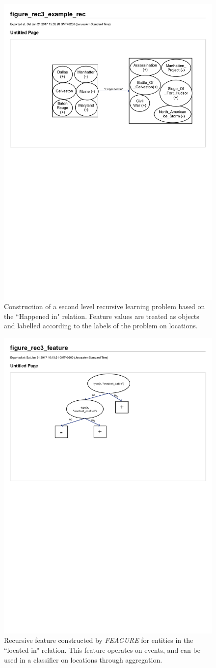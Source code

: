 \documentclass[twoside,11pt]{article}
\theoremstyle{definition}
\begin{document}
 \begin{figure}[!h]
 	\centering
 	\includegraphics[width=0.7\linewidth]{figure_rec3_example_rec}
 	\caption{Construction of a second level recursive learning problem based on the ``Happened in" relation. Feature values are treated as objects and labelled according to the labels of the problem on locations.}
 	\label{fig:figure_rec3_example_rec}
 \end{figure}
 
 \begin{figure}[!h]
 	\centering
 	\includegraphics[width=0.4\linewidth]{figure_rec3_feature}
 	\caption{Recursive feature constructed by \emph{FEAGURE} for entities in the ``located in" relation. This feature operates on events, and can be used in a classifier on locations through aggregation.}
 	\label{fig:figure_rec3_feature}
 \end{figure}
\end{document}
